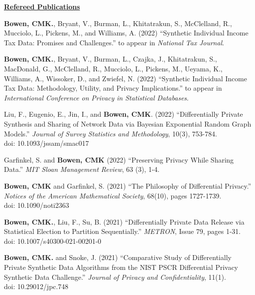 \documentclass[11pt, letterpaper, roman]{moderncv} %
\begin{document}
\vspace{6pt}
\noindent\underline{\textbf{Refereed Publications}}
\vspace{4pt}
\begin{etaremune}[topsep=0pt, itemsep=3pt, partopsep=0pt, parsep=0pt]
    \item \textbf{Bowen, CMK.}, Bryant, V., Burman, L., Khitatrakun, S., McClelland, R., Mucciolo, L., Pickens, M., and Williams, A. (2022) ``Synthetic Individual Income Tax Data: Promises and Challenges.'' to appear in  \textit{National Tax Journal}.
    
    \item \textbf{Bowen, CMK.}, Bryant, V., Burman, L., Czajka, J., Khitatrakun, S., MacDonald, G., McClelland, R., Mucciolo, L., Pickens, M., Ueyama, K., Williams, A., Wissoker, D., and Zwiefel, N. (2022) ``Synthetic Individual Income Tax Data: Methodology, Utility, and Privacy Implications.'' to appear in  \textit{International Conference on Privacy in Statistical Databases}.
    
    \item Liu, F., Eugenio, E., Jin, I., and \textbf{Bowen, CMK}. (2022) ``Differentially Private Synthesis and Sharing of Network Data via Bayesian Exponential Random Graph Models.'' \textit{Journal of Survey Statistics and Methodology}, 10(3), 753-784.\\
    doi: 10.1093/jssam/smac017
    
    \item Garfinkel, S. and \textbf{Bowen, CMK} (2022) ``Preserving Privacy While Sharing Data.'' \textit{MIT Sloan Management Review}, 63 (3), 1-4.
    
    \item \textbf{Bowen, CMK} and Garfinkel, S. (2021) ``The Philosophy of Differential Privacy.'' \textit{Notices of the American Mathematical Society}, 68(10), pages 1727-1739.\\
    doi: 10.1090/noti2363
    
    \item \textbf{Bowen, CMK.}, Liu, F., Su, B. (2021) ``Differentially Private Data Release via Statistical Election to Partition Sequentially.'' \textit{METRON}, Issue 79, pages 1-31.\\
    doi: 10.1007/s40300-021-00201-0
    
    \item \textbf{Bowen, CMK.} and Snoke, J. (2021) ``Comparative Study of Differentially Private Synthetic Data Algorithms from the NIST PSCR Differential Privacy Synthetic Data Challenge.'' \textit{Journal of Privacy and Confidentiality}, 11(1).\\
    doi: 10.29012/jpc.748
    

\end{etaremune}
\end{document}
